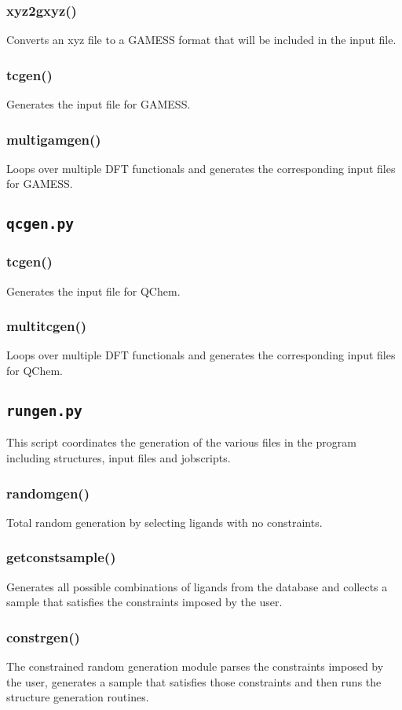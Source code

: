 \documentclass[a4paper,12pt]{assignment}
\begin{document}
\subsubsection{xyz2gxyz()}
Converts an xyz file to a GAMESS format that will be included in the input file.
\subsubsection{tcgen()}
Generates the input file for GAMESS.
\subsubsection{multigamgen()}
Loops over multiple DFT functionals and generates the corresponding input files for GAMESS.
\subsection{\texttt{qcgen.py}}
\subsubsection{tcgen()}
Generates the input file for QChem.
\subsubsection{multitcgen()}
Loops over multiple DFT functionals and generates the corresponding input files for QChem.

\subsection{\texttt{rungen.py}}
This script coordinates the generation of the various files in the program including structures, input files and jobscripts.
\subsubsection{randomgen()}
Total random generation by selecting ligands with no constraints.
\subsubsection{getconstsample()}
Generates all possible combinations of ligands from the database and collects a sample that satisfies the constraints imposed by the user.
\subsubsection{constrgen()}
The constrained random generation module parses the constraints imposed by the user, generates a sample that satisfies those constraints and then runs the structure generation routines.
\end{document}
